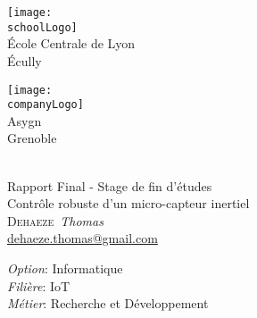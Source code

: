 \documentclass[%
    paper=A4,               %
    twoside=true,           %
    openany,                %
    chapterprefix=true,     %
    12pt,                   %
    headings=normal,        %
    bibliography=totoc,     %
    titlepage=on,           %
    captions=tableabove,    %
    draft=false             %
]{book}%
\makeatletter
\newcommand{\reportTitle}{Contrôle robuste d'un micro-capteur inertiel}
\newcommand{\reportType}{Rapport Final - Stage de fin d'études}
\newcommand{\authorFirstName}{Thomas}
\newcommand{\authorLastName}{Dehaeze}
\newcommand{\authorEmail}{dehaeze.thomas@gmail.com}
\newcommand{\schoolName}{\'Ecole Centrale de Lyon}
\newcommand{\schoolPlace}{\'Ecully}
\newcommand{\schoolLogo}{./logos/logo-ecl.eps}
\newcommand{\companyName}{Asygn}
\newcommand{\companyPlace}{Grenoble}
\newcommand{\companyLogo}{./logos/logo-asygn.png}
\makeatother
\begin{document}

\frontmatter



\begin{titlepage}
    \begin{minipage}{0.4\textwidth}
        \begin{flushleft}
            \texttt{[image: \\schoolLogo]}\\[0.5\baselineskip]
            \schoolName{}\\
            \schoolPlace{}\\
        \end{flushleft}
    \end{minipage}
    \hfill
    \begin{minipage}{0.4\textwidth}
        \begin{flushright}
            \texttt{[image: \\companyLogo]}\\[0.5\baselineskip]
            \companyName{}\\
            \companyPlace{}\\
        \end{flushright}
    \end{minipage}\\[3.0\baselineskip]

    \centering
    {\large \reportType}\\[1.0\baselineskip]
    {\Large \reportTitle}\\[1.5\baselineskip]
    {\scshape \authorLastName}~\textit{\authorFirstName}\\[0.5\baselineskip]
    \href{mailto:\authorEmail}{\authorEmail}\\[3.0\baselineskip]

    \vfill

    \begin{flushleft}
        \emph{Option}: Informatique\\
        \emph{Filière}: IoT\\
        \emph{Métier}: Recherche et Développement\\[2.0\baselineskip]
    \end{flushleft}


\end{titlepage}
\end{document}
